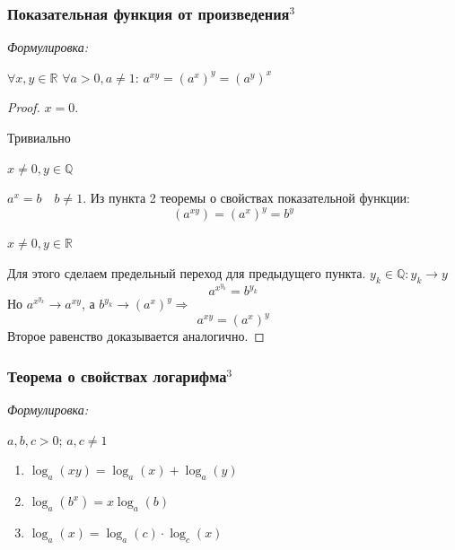 \documentclass{article}
\begin{document}
\subsubsection{Показательная функция от произведения\texorpdfstring{$^3$}{}}
\textit{Формулировка: }

$\forall x, y \in \mathbb{R}$ $\forall a > 0, a\neq 1$: $a^{xy} = \left(a^x\right)^y = \left(a^y\right)^x$

\begin{proof}
\item $x = 0$.

Тривиально
\item $x\neq 0, y \in \mathbb{Q}$

$a^x = b\quad b\neq 1$. Из пункта 2 теоремы о свойствах показательной функции:
\begin{equation*}
\left(a^{xy}\right) = \left(a^x\right)^y = b^y
\end{equation*}
\item $x\neq 0, y \in \mathbb{R}$

Для этого сделаем предельный переход для предыдущего пункта. $y_k \in \mathbb{Q}: y_k \to y$
\begin{equation*}
a^{x^{y_k}} = b^{y_k}
\end{equation*}
Но $a^{x^{y_k}} \to a^{xy}$, а $b^{y_k} \to  \left(a^x\right)^y \Rightarrow$
\begin{equation*}
a^{xy} = \left(a^x\right)^y
\end{equation*}
Второе равенство доказывается аналогично.
\end{proof}

\subsubsection{Теорема о свойствах логарифма\texorpdfstring{$^3$}{}}
\textit{Формулировка:}

$a, b, c > 0$; $a, c \neq 1$
\begin{enumerate}
\item $\log_a(xy) = \log_a(x) + \log_a(y)$
\item $\log_a(b^x) = x\log_a(b)$
\item $\log_a(x) = \log_a(c)\cdot \log_c(x)$
\end{enumerate}
\end{document}
